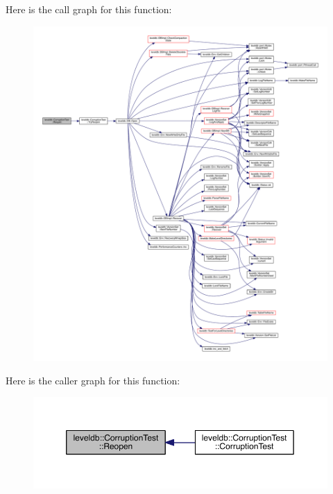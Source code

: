 Here is the call graph for this function\+:\nopagebreak
\begin{figure}[H]
\begin{center}
\leavevmode
\includegraphics[width=350pt]{classleveldb_1_1_corruption_test_aab4c6a5ca8757d5e62caaf66e90d8f8f_cgraph}
\end{center}
\end{figure}




Here is the caller graph for this function\+:\nopagebreak
\begin{figure}[H]
\begin{center}
\leavevmode
\includegraphics[width=350pt]{classleveldb_1_1_corruption_test_aab4c6a5ca8757d5e62caaf66e90d8f8f_icgraph}
\end{center}
\end{figure}


\hypertarget{classleveldb_1_1_corruption_test_aff36b45496c39a006a14df201ef7d57b}{}
